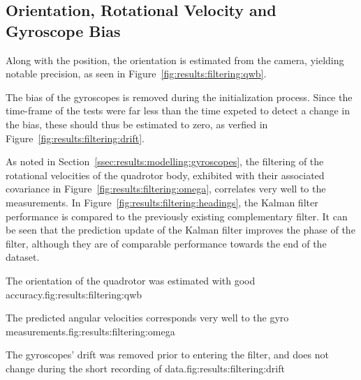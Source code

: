 \subsection{Orientation, Rotational Velocity and Gyroscope Bias}
    Along with the position, the orientation is estimated from the camera,
    yielding notable precision, as seen in Figure~\ref{fig:results:filtering:qwb}.

    The bias of the gyroscopes is removed during the initialization process.
    Since the time-frame of the tests were far less than the time expeted to
    detect a change in the bias, these should thus be estimated to zero,
    as verfied in Figure~\ref{fig:results:filtering:drift}.

    As noted in Section~\ref{ssec:results:modelling:gyroscopes}, the
    filtering of the rotational velocities of the quadrotor body,
    exhibited with their associated covariance in Figure~\ref{fig:results:filtering:omega},
    correlates very well to the measurements.
    In Figure~\ref{fig:results:filtering:headings}, the Kalman filter performance is compared
    to the previously existing complementary filter. It can be seen that
    the prediction update of the Kalman filter improves the phase of the filter,
    although they are of comparable performance towards the end of the dataset.

    \begin{subfigures}{The orientation of the quadrotor was estimated with good accuracy.}{fig:results:filtering:qwb}
    \end{subfigures}

    \begin{subfigures}{The predicted angular velocities corresponds very well to the gyro measurements.}{fig:results:filtering:omega}
    \end{subfigures}

    \begin{subfigures}{The gyroscopes' drift was removed prior to entering the filter, and does not change during the short recording of data.}{fig:results:filtering:drift}
    \end{subfigures}

